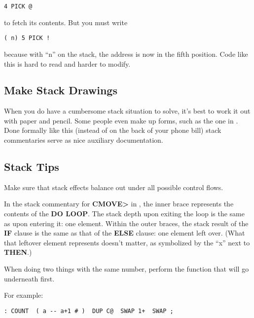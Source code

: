 \begin{verbatim}
4 PICK @
\end{verbatim}

to fetch its contents. But you must write

\begin{verbatim}
( n) 5 PICK !
\end{verbatim}

because with ``n'' on the stack, the address is now in the fifth position.
Code like this is hard to read and harder to modify.

\subsection{Make Stack Drawings}

When you do have a cumbersome stack situation to solve, it's best to work
it out with paper and pencil. Some people even make up forms, such as the
one in . Done formally like this (instead of on the back of your
phone bill) stack commentaries serve as nice auxiliary documentation.

\subsection{Stack Tips}

\begin{tip}
Make sure that stack effects balance out under all possible control flows.
\end{tip}
In the stack commentary for \textbf{CMOVE>} in , the inner brace
represents the contents of the \textbf{DO LOOP}. The stack depth upon exiting
the loop is the same as upon entering it: one element. Within the outer
braces, the stack result of the \textbf{IF} clause is the same as that of the
\textbf{ELSE} clause: one element left over. (What that leftover element
represents doesn't matter, as symbolized by the ``x'' next to \textbf{THEN}.)



\begin{tip}
When doing two things with the same number, perform the function that
will go underneath first.
\end{tip}
For example:

\begin{verbatim}
: COUNT  ( a -- a+1 # )  DUP C@  SWAP 1+  SWAP ;
\end{verbatim}

